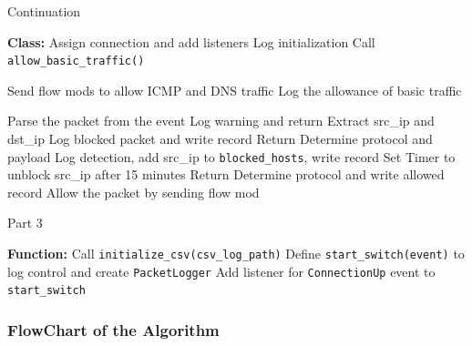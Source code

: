 \documentclass[12pt,letterpaper]{article}
\begin{document}
    
    \begin{algorithm}
    \caption{Continuation}
    \begin{algorithmic}[2]
\State {}
    \State \textbf{Class:} 
        \State Assign connection and add listeners
        \State Log initialization
        \State Call \texttt{allow\_basic\_traffic()}
    \EndProcedure

        \State Send flow mods to allow ICMP and DNS traffic
        \State Log the allowance of basic traffic
    \EndProcedure

        \State Parse the packet from the event
            \State Log warning and return
        \EndIf
            \State Extract src\_ip and dst\_ip
                \State Log blocked packet and write record
                \State Return
            \EndIf
                \State Determine protocol and payload
                    \State Log detection, add src\_ip to \texttt{blocked\_hosts}, write record
                    \State Set Timer to unblock src\_ip after 15 minutes
                    \State Return
                \EndIf
            \EndIf
            \State Determine protocol and write allowed record
            \State Allow the packet by sending flow mod
        \EndIf
    \EndProcedure
\end{algorithmic}
\end{algorithm}

\begin{algorithm}[H]
    \caption{Part 3}
\begin{algorithmic}[3]
    \State {}
     \State \textbf{Function:}
        \State Call \texttt{initialize\_csv(csv\_log\_path)}
        \State Define \texttt{start\_switch(event)} to log control and create \texttt{PacketLogger}
        \State Add listener for \texttt{ConnectionUp} event to \texttt{start\_switch}
\end{algorithmic}
\end{algorithm}


\subsubsection{FlowChart of the Algorithm}
\end{document}

